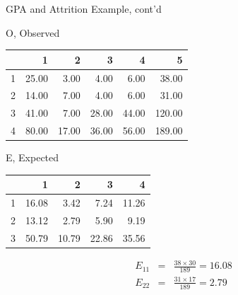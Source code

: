 \documentclass[14pt]{beamer}\usepackage[]{graphicx}\usepackage[]{color}
\begin{document}
\begin{frame}[fragile]{GPA and Attrition Example, cont'd}

\begin{minipage}[ht]{6cm}

{\tiny{

O, Observed 

\begin{table}[ht]
\centering
\begin{tabular}{rrrrrr}
  \hline
 & 1 & 2 & 3 & 4 & 5 \\ 
  \hline
1 & 25.00 & 3.00 & 4.00 & 6.00 & 38.00 \\ 
  2 & 14.00 & 7.00 & 4.00 & 6.00 & 31.00 \\ 
  3 & 41.00 & 7.00 & 28.00 & 44.00 & 120.00 \\ 
  4 & 80.00 & 17.00 & 36.00 & 56.00 & 189.00 \\ 
   \hline
\end{tabular}
\end{table}

}}
\end{minipage} \hfill
\begin{minipage}[ht]{5cm}

{\tiny{

E, Expected

\begin{table}[ht]
\centering
\begin{tabular}{rrrrr}
  \hline
 & 1 & 2 & 3 & 4 \\ 
  \hline
1 & 16.08 & 3.42 & 7.24 & 11.26 \\ 
  2 & 13.12 & 2.79 & 5.90 & 9.19 \\ 
  3 & 50.79 & 10.79 & 22.86 & 35.56 \\ 
   \hline
\end{tabular}
\end{table}

}}
\end{minipage}

{\small{
\begin{eqnarray*}
E_{11} &=& \frac{38 \times 30}{189} = 16.08 \\
E_{22} &=& \frac{31 \times 17}{189} = 2.79
\end{eqnarray*}
}}
\end{frame}
\end{document}
